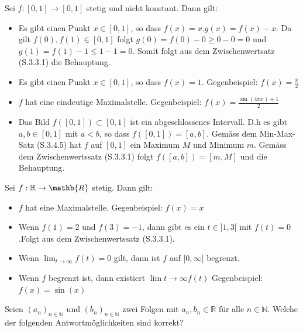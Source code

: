 \documentclass[7pt,landscape, margin = 0.1mm]{article}
\begin{document}
\begin{multicols}{4}
\begin{flushleft}
\begin{flushleft}
\vspace{1mm} \hline \vspace{1mm}
Sei $f:[0,1] \to [0,1]$ stetig und nicht konstant. Dann gilt:
\begin{itemize}
\item[\textcolor{green}{C}] Es gibt einen Punkt $x \in [0,1]$, so dass $f(x)=x$.\textcolor{Emerald}{$g(x)= f(x)-x$. Da gilt $f(0),f(1) \in [0,1]$ folgt $g(0)=f(0)-0 \geq 0-0  = 0$ und $g(1) = f(1)-1 \leq 1-1 = 0$. Somit folgt aus dem Zwischenwertsatz (S.3.3.1) die Behauptung.}
\item[\textcolor{red}{W}]Es gibt einen Punkt $x \in [0,1]$, so dass $f(x)=1$.
\textcolor{Emerald}{Gegenbeispiel: $f(x)= \frac{x}{2}$}
\item[\textcolor{red}{W}] $f$ hat eine eindeutige Maximalstelle.
\textcolor{Emerald}{Gegenbeispiel: $f(x) = \frac{\sin(4\pi x)+1}{2}$}
\item[\textcolor{green}{C}] Das Bild $f([0,1]) \subset [0,1]$ ist ein abgeschlossenes Intervall. D.h es gibt $a,b \in [0,1]$ mit $a < b$, so dass $f([0,1]) = [a,b]$.
\textcolor{Emerald}{Gemäss dem Min-Max-Satz (S.3.4.5) hat $f$ auf $[0,1]$ ein Maximum $M$ und Minimum $m$. Gemäss dem Zwischenwertssatz (S.3.3.1) folgt $f([a,b]) = [m,M]$ und die Behauptung. }
\end{itemize}

\vspace{1mm} \hline \vspace{1mm}
Sei $f: \mathbb{R} \to \mathb{R}$ stetig. Dann gilt:
\begin{itemize}


\item[\textcolor{red}{W}] $f$ hat eine Maximalstelle.\textcolor{Emerald}{ Gegenbeispiel: $f(x)=x$}
\item[\textcolor{green}{C}] Wenn $f(1) = 2$ und $f(3) = -1$, dann gibt es ein $t\in]1,3[$ mit $f(t) = 0$.\textcolor{Emerald}{Folgt aus dem Zwischenwertssatz (S.3.3.1).}
\item[\textcolor{green}{C}] Wenn $\lim_{t \to \infty} f(t) = 0$ gilt, dann ist $f$ auf $[0,\infty[$ begrenzt.

\item[\textcolor{red}{W}] Wenn $f$ begrenzt ist, dann existiert $\lim{t \to \infty} f(t)$ \textcolor{Emerald}{Gegenbeispiel: $f(x) = \sin(x)$}
\end{itemize}
\vspace{1mm} \hline \vspace{1mm}
Seien $\left(a_n\right)_{n \in \mathbb{N}}$ und $\left(b_n\right)_{n \in \mathbb{N}}$ zwei Folgen mit $a_n, b_n \in \mathbb{R}$ für alle $n \in \mathbb{N}$. Welche der folgenden Antwortmöglichkeiten sind korrekt?
\begin{itemize}




\end{itemize}
\end{flushleft}
\end{flushleft}
\end{multicols}
\end{document}
